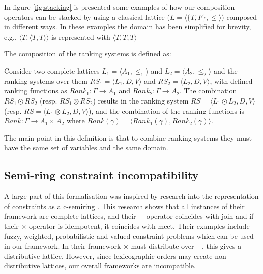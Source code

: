 In figure \ref{fig:stacking} is presented some examples of how our composition operators can be stacked
by using a classical lattice ($L = \langle \{T,F\}, \leq \rangle$) composed in different ways.
In these examples the domain has been simplified for brevity, 
e.g., $\langle T, \langle T,T\rangle\rangle$ is represented with $\langle T,T,T\rangle$

The composition of the ranking systems is defined as:
\begin{defs}
Consider two complete lattices $L_1 = \langle A_1, \leq_1 \rangle$ and $L_2 = \langle A_2,\leq_2 \rangle$ and
the ranking systems over them $RS_1 = \langle L_1,D,V \rangle $ and $RS_2 = \langle L_2,D,V \rangle$,
with defined ranking functions as $Rank_1: \Gamma \rightarrow A_1 $ and $Rank_2: \Gamma \rightarrow A_2$.
The combination $RS_1 \odot RS_2$ (resp. $RS_1 \otimes RS_2$) results in the ranking system 
$RS = \langle L_1 \odot L_2, D, V \rangle$ (resp. $RS = \langle L_1 \otimes L_2, D, V \rangle$), 
and the combination of the ranking functions is 
$Rank: \Gamma \rightarrow A_1 \times A_2$ where $Rank(\gamma) = \langle Rank_1(\gamma), Rank_2(\gamma) \rangle$.
\end{defs}

The main point in this definition is that to combine ranking systems they must have the same set of variables 
and the same domain.

\subsection{Semi-ring constraint incompatibility}
A large part of this formalisation was inspired by research into the representation of constraints as a c-semiring \cite{Bistarelli1997}.
This research shows that all instances of their framework are complete lattices, and their $+$ operator coincides with join
and if their $\times$ operator is idempotent, it coincides with meet.
Their examples include fuzzy, weighted, probabilistic and valued constraint problems which can be used in our framework.
In their framework $\times$ must distribute over $+$, this gives a distributive lattice.
However, since lexicographic orders may create non-distributive lattices, our overall frameworks are incompatible.


